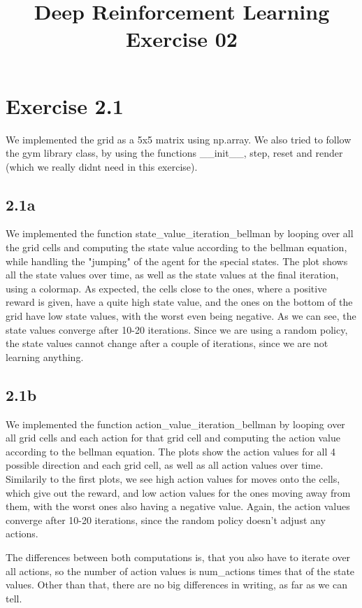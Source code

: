 \documentclass{article} %
\begin{document}
	
	\title{Deep Reinforcement Learning Exercise 02}
	\maketitle
	
	\section{Exercise 2.1}
	We implemented the grid as a 5x5 matrix using np.array. We also tried to follow the gym library class, by using the functions __init__, step, reset and render (which we really didnt need in this exercise). 
	\subsection{2.1a}
	We implemented the function state_value_iteration_bellman by looping over all the grid cells and computing the state value according to the bellman equation, while handling the "jumping" of the agent for the special states. 
	The plot shows all the state values over time, as well as the state values at the final iteration, using a colormap. As expected, the cells close to the ones, where a positive reward is given, have a quite high state value, and the ones on the bottom of the grid have low state values, with the worst even being negative. 
	As we can see, the state values converge after 10-20 iterations. Since we are using a random policy, the state values cannot change after a couple of iterations, since we are not learning anything. 
	\subsection{2.1b}
	We implemented the function action_value_iteration_bellman by looping over all grid cells and each action for that grid cell and computing the action value according to the bellman equation. 
	The plots show the action values for all 4 possible direction and each grid cell, as well as all action values over time. Similarily to the first plots, we see high action values for moves onto the cells, which give out the reward, and low action values for the ones moving away from them, with the worst ones also having a negative value. 
	Again, the action values converge after 10-20 iterations, since the random policy doesn't adjust any actions. 

	The differences between both computations is, that you also have to iterate over all actions, so the number of action values is num_actions times that of the state values. Other than that, there are no big differences in writing, as far as we can tell. 
	
\end{document}
